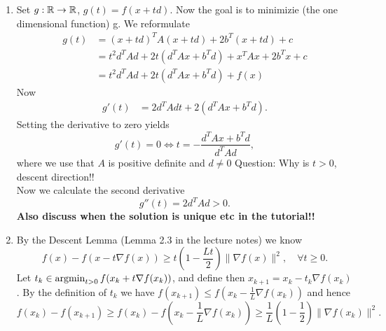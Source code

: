 \documentclass{ExerciseSheet}
\begin{document}
\begin{solution}
    \renewcommand{\labelenumi}{\alph{enumi})}

\begin{enumerate}
    \item Set $g:\mathbb{R} \rightarrow \mathbb{R}$, $g(t)=f(x+td)$. Now the goal is to minimizie (the one dimensional function) g. We reformulate
    \begin{align*}
        g(t) &= (x+td)^TA (x+td) + 2b^T(x+td) + c \\
        &= t^2d^TAd + 2t \left(d^TAx + b^Td\right) + x^TAx + 2b^Tx + c \\
        &=t^2d^TAd + 2t \left(d^TAx + b^Td\right) + f(x)
    \end{align*}
    Now 
    \begin{align*}
        g'(t)&= 2d^TAd t + 2\left(d^TAx + b^Td\right).
    \end{align*}
    Setting the derivative to zero yields
    \begin{equation}
        g'(t) = 0 \Leftrightarrow t = -\frac{d^TAx + b^Td}{d^TAd},
    \end{equation}
    where we use that $A$ is positive definite and $d\neq 0$
    Question: Why is $t>0$, descent direction!! \\ 
    Now we calculate the second derivative
    \begin{equation*}
        g''(t)=2d^TAd >0.
    \end{equation*}
    \textbf{Also discuss when the solution is unique etc in the tutorial!!}
    \item By the Descent Lemma (Lemma 2.3 in the lecture notes) we know
    \begin{equation*}
        f(x)-f(x-t\nabla f(x)) \geq t\left(1-\frac{Lt}{2}\right) \|\nabla f(x)\|^2, \quad \forall t\geq 0.
    \end{equation*}
    Let $t_k \in \operatorname*{argmin}_{t>0} f(x_k +t\nabla f(x_k))$, and define then $x_{k+1}=x_k - t_k \nabla f(x_k)$. By the definition of $t_k$ we have $f(x_{k+1})\leq f(x_k - \frac{1}{L}\nabla f(x_k))$ and hence
    \begin{equation*}
        f(x_k) - f(x_{k+1}) \geq f(x_k) - f(x_k - \frac{1}{L}\nabla f(x_k)) \geq \frac{1}{L}(1-\frac{1}{2}) \|\nabla f(x_k)\|^2.
    \end{equation*}
 \end{enumerate}
\end{solution}

\fi


\vskip 0.5cm
\end{document}
